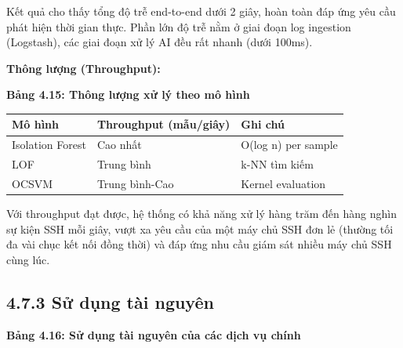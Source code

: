 \documentclass[
  a4paper]{report}
\newcounter{none} %
\begin{document}
Kết quả cho thấy tổng độ trễ end-to-end dưới 2 giây, hoàn toàn đáp ứng
yêu cầu phát hiện thời gian thực. Phần lớn độ trễ nằm ở giai đoạn log
ingestion (Logstash), các giai đoạn xử lý AI đều rất nhanh (dưới 100ms).

\textbf{Thông lượng (Throughput):}

\textbf{Bảng 4.15: Thông lượng xử lý theo mô hình}

{\def\LTcaptype{none} %
\begin{longtable}[]{@{}lll@{}}
\toprule\noalign{}
Mô hình & Throughput (mẫu/giây) & Ghi chú \\
\midrule\noalign{}
\endhead
\bottomrule\noalign{}
\endlastfoot
Isolation Forest & Cao nhất & O(log n) per sample \\
LOF & Trung bình & k-NN tìm kiếm \\
OCSVM & Trung bình-Cao & Kernel evaluation \\
\end{longtable}
}

Với throughput đạt được, hệ thống có khả năng xử lý hàng trăm đến hàng
nghìn sự kiện SSH mỗi giây, vượt xa yêu cầu của một máy chủ SSH đơn lẻ
(thường tối đa vài chục kết nối đồng thời) và đáp ứng nhu cầu giám sát
nhiều máy chủ SSH cùng lúc.

\subsection{4.7.3 Sử dụng tài
nguyên}\label{sux1eed-dux1ee5ng-tuxe0i-nguyuxean}

\textbf{Bảng 4.16: Sử dụng tài nguyên của các dịch vụ chính}
\end{document}
